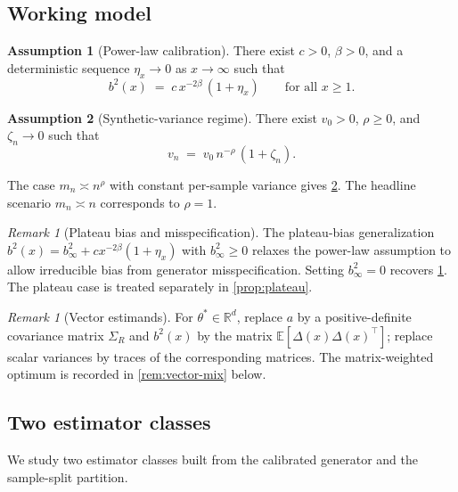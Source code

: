 \documentclass[11pt]{article}
\theoremstyle{plain}
\theoremstyle{definition}
\newtheorem{assumption}{Assumption}[section]
\theoremstyle{remark}
\newtheorem{remark}[theorem]{Remark}
\newcommand{\R}{\mathbb{R}}
\newcommand{\E}{\mathbb{E}}
\begin{document}
\subsection{Working model}
\label{ssec:working-model}

\begin{assumption}[Power-law calibration]\label{asm:pl}
There exist $c>0$, $\beta>0$, and a deterministic sequence $\eta_x\to0$ as $x\to\infty$ such that
\begin{equation}\label{eq:pl}
b^2(x)\;=\;c\,x^{-2\beta}\,(1+\eta_x)\qquad\text{for all }x\ge1.
\end{equation}
\end{assumption}

\begin{assumption}[Synthetic-variance regime]\label{asm:vn}
There exist $v_0>0$, $\rho\ge0$, and $\zeta_n\to0$ such that
\begin{equation}\label{eq:vn}
v_n\;=\;v_0\,n^{-\rho}\,(1+\zeta_n).
\end{equation}
\end{assumption}

The case $m_n\asymp n^\rho$ with constant per-sample variance gives \cref{asm:vn}. The headline scenario $m_n\asymp n$ corresponds to $\rho=1$.

\begin{remark}[Plateau bias and misspecification]\label{rem:plateau-setup}
The plateau-bias generalization $b^2(x)=b_\infty^2+cx^{-2\beta}(1+\eta_x)$ with $b_\infty^2\ge0$ relaxes the power-law assumption to allow irreducible bias from generator misspecification. Setting $b_\infty^2=0$ recovers \cref{asm:pl}. The plateau case is treated separately in \cref{prop:plateau}.
\end{remark}

\begin{remark}[Vector estimands]\label{rem:vector}
For $\theta^*\in\R^d$, replace $a$ by a positive-definite covariance matrix $\Sigma_R$ and $b^2(x)$ by the matrix $\E[\Delta(x)\Delta(x)^\top]$; replace scalar variances by traces of the corresponding matrices. The matrix-weighted optimum is recorded in \cref{rem:vector-mix} below.
\end{remark}

\subsection{Two estimator classes}
\label{ssec:classes}

We study two estimator classes built from the calibrated generator and the sample-split partition.
\end{document}
